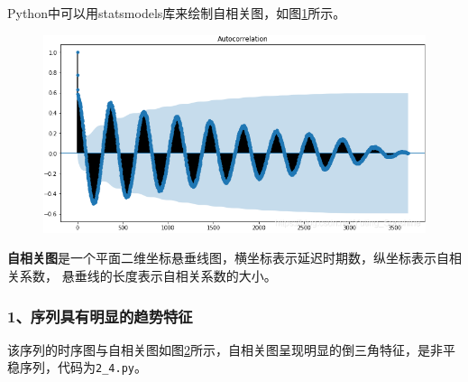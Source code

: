 \documentclass[12pt, a4paper, oneside]{ctexbook}
\begin{document}
Python中可以用statsmodels库来绘制自相关图，如图\ref{im2_3}所示。
\begin{figure}[h]
    \centering
    \includegraphics[scale=0.4]{img/2_3.png}
    \caption{}
    \label{im2_3}
\end{figure}

\textbf{自相关图}是一个平面二维坐标悬垂线图，横坐标表示延迟时期数，纵坐标表示自相关系数，
悬垂线的长度表示自相关系数的大小。

\subsubsection{1、序列具有明显的趋势特征}
该序列的时序图与自相关图如图\ref{im2_4}所示，自相关图呈现明显的倒三角特征，是非平稳序列，代码为\texttt{2\_4.py}。

\begin{figure}[ht]
    \centering
    \hfill
    \caption{}
    \label{im2_4}
\end{figure}
\end{document}
